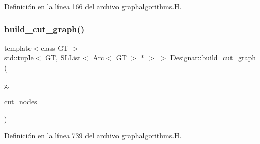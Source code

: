 Definición en la línea 166 del archivo graphalgorithms.\+H.

\mbox{\label{namespace_designar_a552f77707068bde5a4449192a1105012}} 
\subsubsection{\texorpdfstring{build\+\_\+cut\+\_\+graph()}{build\_cut\_graph()}}
{\footnotesize\ttfamily template$<$class GT $>$ \\
std\+::tuple$<$ \hyperlink{demo-buildgraph_8_c_a3001c40d2c31ca87ed96cd7d1334a55e}{GT}, \hyperlink{class_designar_1_1_s_l_list}{S\+L\+List}$<$ \hyperlink{namespace_designar_a3f55fb5513d62ff47cbc8f72b8e95d6f}{Arc}$<$ \hyperlink{demo-buildgraph_8_c_a3001c40d2c31ca87ed96cd7d1334a55e}{GT} $>$ $\ast$ $>$ $>$ Designar\+::build\+\_\+cut\+\_\+graph (\begin{DoxyParamCaption}\item[{\hyperlink{demo-buildgraph_8_c_a3001c40d2c31ca87ed96cd7d1334a55e}{GT} \&}]{g,  }\item[{const \hyperlink{class_designar_1_1_s_l_list}{S\+L\+List}$<$ \hyperlink{namespace_designar_a5af326c65aa2bd26b26c410f2030d09e}{Node}$<$ \hyperlink{demo-buildgraph_8_c_a3001c40d2c31ca87ed96cd7d1334a55e}{GT} $>$ $\ast$$>$ \&}]{cut\+\_\+nodes }\end{DoxyParamCaption})}



Definición en la línea 739 del archivo graphalgorithms.\+H.

\mbox{\label{namespace_designar_aecd027238b87a5b24792ea3ccd0c44b1}} 
